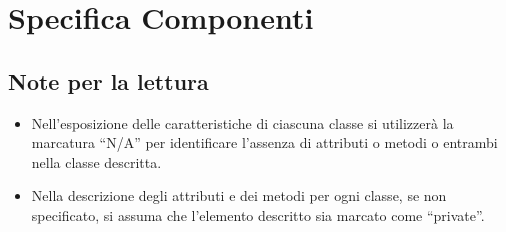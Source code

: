 %
%


\section{Specifica Componenti} %
\label{sec:specifica_componenti}

	\subsection{Note per la lettura} %
	\label{sub:note_specifica}
	\begin{itemize}
		\item Nell'esposizione delle caratteristiche di ciascuna classe si utilizzerà la marcatura ``N/A'' per identificare l'assenza di attributi o metodi o entrambi nella classe descritta.
		\item Nella descrizione degli attributi e dei metodi per ogni classe, se non specificato, si assuma che l'elemento descritto sia marcato come ``private''.
	\end{itemize}

	\clearpage \newpage
	 \clearpage \newpage
	 \clearpage \newpage
	 \clearpage \newpage
